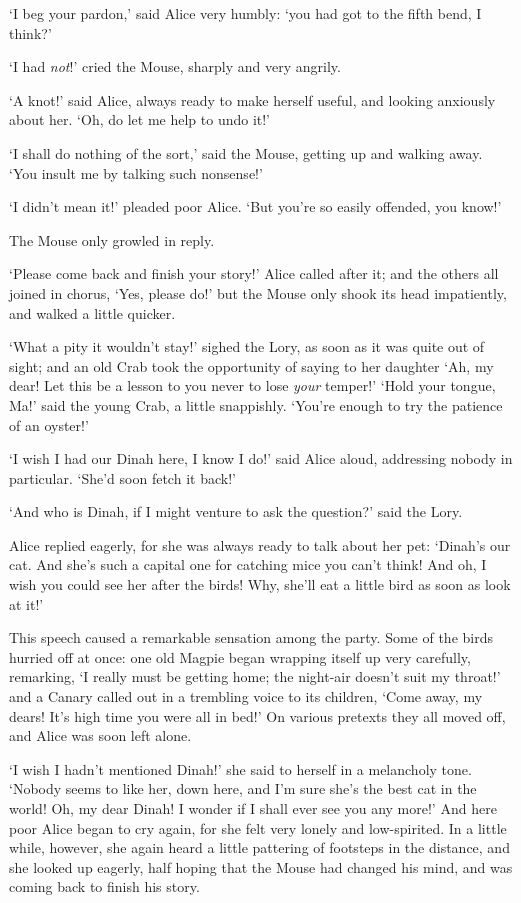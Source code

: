 \documentclass[12pt,openany]{memoir}
\begin{document}
`I beg your pardon,' said Alice very humbly: `you had got to the fifth bend, I think?'

`I had \textit{not}!' cried the Mouse, sharply and very angrily.

`A knot!' said Alice, always ready to make herself useful, and looking anxiously about her. `Oh, do let me help to undo it!'

`I shall do nothing of the sort,' said the Mouse, getting up and walking away. `You insult me by talking such nonsense!'

`I didn't mean it!' pleaded poor Alice. `But you're so easily offended, you know!'

The Mouse only growled in reply.

`Please come back and finish your story!' Alice called after it; and the others all joined in chorus, `Yes, please do!' but the Mouse only shook its head impatiently, and walked a little quicker.

`What a pity it wouldn't stay!' sighed the Lory, as soon as it was quite out of sight; and an old Crab took the opportunity of saying to her daughter `Ah, my dear! Let this be a lesson to you never to lose \textit{your} temper!' `Hold your tongue, Ma!' said the young Crab, a little snappishly. `You're enough to try the patience of an oyster!'

`I wish I had our Dinah here, I know I do!' said Alice aloud, addressing nobody in particular. `She'd soon fetch it back!'

`And who is Dinah, if I might venture to ask the question?' said the Lory.

Alice replied eagerly, for she was always ready to talk about her pet: `Dinah's our cat. And she's such a capital one for catching mice you can't think! And oh, I wish you could see her after the birds! Why, she'll eat a little bird as soon as look at it!'

This speech caused a remarkable sensation among the party. Some of the birds hurried off at once: one old Magpie began wrapping itself up very carefully, remarking, `I really must be getting home; the night-air doesn't suit my throat!' and a Canary called out in a trembling voice to its children, `Come away, my dears! It's high time you were all in bed!' On various pretexts they all moved off, and Alice was soon left alone.

`I wish I hadn't mentioned Dinah!' she said to herself in a melancholy tone. `Nobody seems to like her, down here, and I'm sure she's the best cat in the world! Oh, my dear Dinah! I wonder if I shall ever see you any more!' And here poor Alice began to cry again, for she felt very lonely and low-spirited. In a little while, however, she again heard a little pattering of footsteps in the distance, and she looked up eagerly, half hoping that the Mouse had changed his mind, and was coming back to finish his story.
\end{document}

